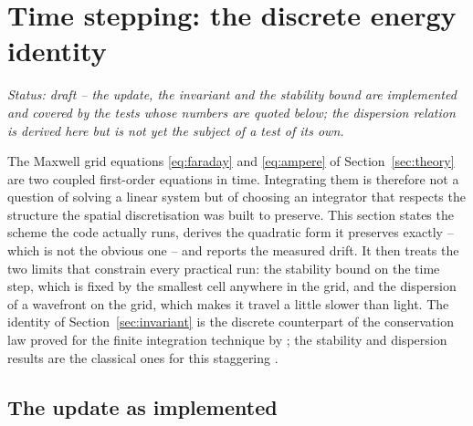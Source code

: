 \section{Time stepping: the discrete energy identity}
\label{sec:energy}

\noindent\emph{Status: draft -- the update, the invariant and the stability bound are implemented and covered by the
tests whose numbers are quoted below; the dispersion relation is derived here but is not yet the subject of a
test of its own.}

The Maxwell grid equations \eqref{eq:faraday} and \eqref{eq:ampere} of Section~\ref{sec:theory} are two coupled
first-order equations in time. Integrating them is therefore not a question of solving a linear system but of
choosing an integrator that respects the structure the spatial discretisation was built to preserve. This section
states the scheme the code actually runs, derives the quadratic form it preserves exactly -- which is not the
obvious one -- and reports the measured drift. It then treats the two limits that constrain every practical run:
the stability bound on the time step, which is fixed by the smallest cell anywhere in the grid, and the dispersion
of a wavefront on the grid, which makes it travel a little slower than light. The identity of
Section~\ref{sec:invariant} is the discrete counterpart of the conservation law proved for the finite integration
technique by \cite{schuhmann2001}; the stability and dispersion results are the classical ones for this staggering
\cite{taflove2005,yee1966}.

\subsection{The update as implemented}
\label{sec:update}

